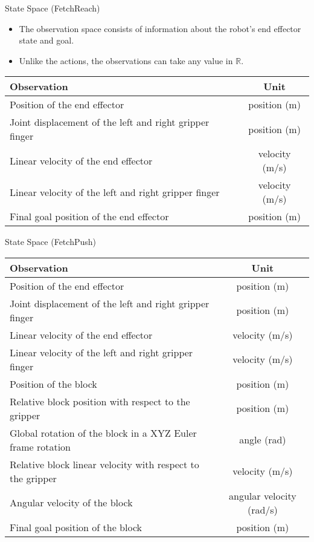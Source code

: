 \begin{frame}{State Space (FetchReach)}
    \vfill
    \begin{itemize}
        \item The observation space consists of information about the robot's end effector state and goal.
        \item Unlike the actions, the observations can take any value in $\mathbb{R}$.
    \end{itemize}
    \vfill
    \begin{tabular}{|l|c|}
        \hline
        Observation & Unit \\
        \hline
        Position of the end effector & position (m) \\
        \hline
        Joint displacement of the left and right gripper finger & position (m) \\
        \hline
        Linear velocity of the end effector & velocity (m/s) \\
        \hline
        Linear velocity of the left and right gripper finger & velocity (m/s) \\
        \hline
        Final goal position of the end effector & position (m) \\
        \hline
    \end{tabular}
    \vfill
\end{frame}

\begin{frame}{State Space (FetchPush)}
    \begin{tabular}{|l|c|}
        \hline
        Observation & Unit \\
        \hline
        Position of the end effector & position (m) \\
        \hline
        Joint displacement of the left and right gripper finger & position (m) \\
        \hline
        Linear velocity of the end effector & velocity (m/s) \\
        \hline
        Linear velocity of the left and right gripper finger & velocity (m/s) \\
        \hline
        Position of the block & position (m) \\
        \hline
        Relative block position with respect to the gripper & position (m) \\
        \hline
        Global rotation of the block in a XYZ Euler frame rotation & angle (rad) \\
        \hline
        Relative block linear velocity with respect to the gripper & velocity (m/s) \\
        \hline
        Angular velocity of the block & angular velocity (rad/s) \\
        \hline
        Final goal position of the block & position (m) \\
        \hline
    \end{tabular}
\end{frame}

